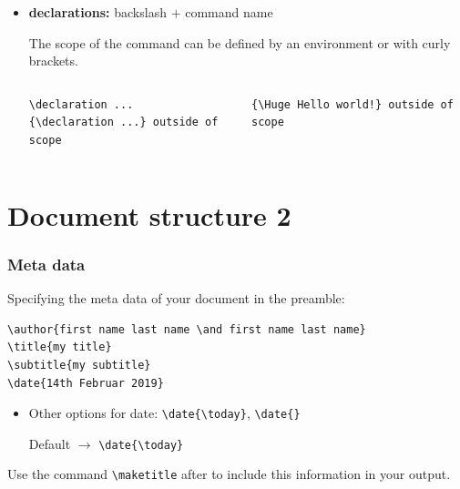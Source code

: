 \begin{frame}[fragile]
\begin{itemize}
\begin{columns}
\end{columns}
\end{itemize}

\pause 

\begin{itemize}

	\item \textbf{declarations:} backslash $+$ command name
	
	The scope of the command can be defined by an environment or with curly brackets. 

\vspace{-.5cm}

\begin{columns}
	
\begin{lstlisting}
\declaration ... 
{\declaration ...} outside of scope

\end{lstlisting}
	
	
\begin{lstlisting}
{\Huge Hello world!} outside of scope
\end{lstlisting}
	
\end{columns}
	
\end{itemize}

\end{frame}


\section{Document structure 2}

\begin{frame}[fragile]
\frametitle{Meta data}

Specifying the meta data of your document in the preamble: 

\begin{lstlisting}
\author{first name last name \and first name last name}
\title{my title}
\subtitle{my subtitle}
\date{14th Februar 2019}
\end{lstlisting}

\begin{itemize}
	\item Other options for date: \lstinline|\date{\today}|, \lstinline|\date{}|
	
	Default $\rightarrow$ \lstinline|\date{\today}|
\end{itemize}

Use the command \lstinline|\maketitle| after \lstinline|| to include this information in your output.
\end{frame}


